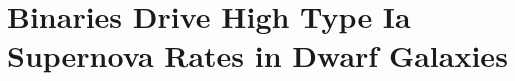 \documentclass[main.tex]{subfiles}
\begin{document}
\chapter{Binaries Drive High Type Ia Supernova Rates in Dwarf Galaxies}
\label{iarates}






\end{document}
